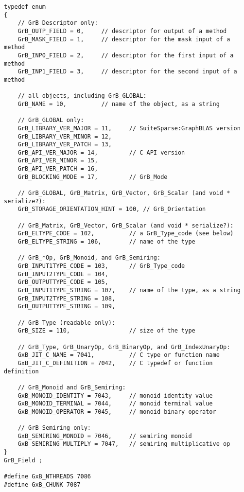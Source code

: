 {\footnotesize
\begin{verbatim}
typedef enum
{
    // GrB_Descriptor only:
    GrB_OUTP_FIELD = 0,     // descriptor for output of a method
    GrB_MASK_FIELD = 1,     // descriptor for the mask input of a method
    GrB_INP0_FIELD = 2,     // descriptor for the first input of a method
    GrB_INP1_FIELD = 3,     // descriptor for the second input of a method

    // all objects, including GrB_GLOBAL:
    GrB_NAME = 10,          // name of the object, as a string

    // GrB_GLOBAL only:
    GrB_LIBRARY_VER_MAJOR = 11,     // SuiteSparse:GraphBLAS version
    GrB_LIBRARY_VER_MINOR = 12,
    GrB_LIBRARY_VER_PATCH = 13,
    GrB_API_VER_MAJOR = 14,         // C API version
    GrB_API_VER_MINOR = 15,
    GrB_API_VER_PATCH = 16,
    GrB_BLOCKING_MODE = 17,         // GrB_Mode

    // GrB_GLOBAL, GrB_Matrix, GrB_Vector, GrB_Scalar (and void * serialize?):
    GrB_STORAGE_ORIENTATION_HINT = 100, // GrB_Orientation

    // GrB_Matrix, GrB_Vector, GrB_Scalar (and void * serialize?):
    GrB_ELTYPE_CODE = 102,          // a GrB_Type_code (see below)
    GrB_ELTYPE_STRING = 106,        // name of the type

    // GrB_*Op, GrB_Monoid, and GrB_Semiring:
    GrB_INPUT1TYPE_CODE = 103,      // GrB_Type_code
    GrB_INPUT2TYPE_CODE = 104,
    GrB_OUTPUTTYPE_CODE = 105,
    GrB_INPUT1TYPE_STRING = 107,    // name of the type, as a string
    GrB_INPUT2TYPE_STRING = 108,
    GrB_OUTPUTTYPE_STRING = 109,

    // GrB_Type (readable only):
    GrB_SIZE = 110,                 // size of the type

    // GrB_Type, GrB_UnaryOp, GrB_BinaryOp, and GrB_IndexUnaryOp:
    GxB_JIT_C_NAME = 7041,          // C type or function name
    GxB_JIT_C_DEFINITION = 7042,    // C typedef or function definition

    // GrB_Monoid and GrB_Semiring:
    GxB_MONOID_IDENTITY = 7043,     // monoid identity value
    GxB_MONOID_TERMINAL = 7044,     // monoid terminal value
    GxB_MONOID_OPERATOR = 7045,     // monoid binary operator

    // GrB_Semiring only:
    GxB_SEMIRING_MONOID = 7046,     // semiring monoid
    GxB_SEMIRING_MULTIPLY = 7047,   // semiring multiplicative op
}
GrB_Field ;

#define GxB_NTHREADS 7086
#define GxB_CHUNK 7087


\end{verbatim}}
